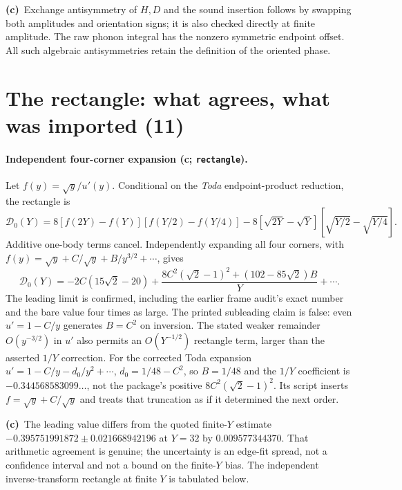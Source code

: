 \documentclass[11pt,a4paper]{article}
\newcommand{\Lc}{\textbf{(c)}\ }
\begin{document}
\Lc Exchange antisymmetry of $H,D$ and the sound insertion follows by swapping
both amplitudes and orientation signs; it is also checked directly at finite
amplitude. The raw phonon integral has the nonzero symmetric endpoint offset.
All such algebraic antisymmetries retain the definition of the oriented phase.

\section{The rectangle: what agrees, what was imported (11)}
\paragraph{Independent four-corner expansion (c; \texttt{rectangle}).}
Let $f(y)=\sqrt y/u'(y)$. Conditional on the \emph{Toda} endpoint-product
reduction, the rectangle is
\begin{equation}
 \mathcal D_0(Y)=8[f(2Y)-f(Y)][f(Y/2)-f(Y/4)]
 -8[\sqrt{2Y}-\sqrt Y][\sqrt{Y/2}-\sqrt{Y/4}].
 \label{eq:rect}
\end{equation}
Additive one-body terms cancel. Independently expanding all four corners,
with $f(y)=\sqrt y+C/\sqrt y+B/y^{3/2}+\cdots$, gives
\begin{equation}
 \mathcal D_0(Y)=-2C(15\sqrt2-20)
 +\frac{8C^2(\sqrt2-1)^2+(102-85\sqrt2)B}{Y}+\cdots.
 \label{eq:rectcorrect}
\end{equation}
The leading limit is confirmed, including the earlier frame audit's exact
number and the bare value four times as large. The printed subleading claim
is false: even $u'=1-C/y$ generates $B=C^2$ on inversion. The stated weaker
remainder $O(y^{-3/2})$ in $u'$ also permits an $O(Y^{-1/2})$ rectangle term,
larger than the asserted $1/Y$ correction. For the corrected Toda expansion
$u'=1-C/y-d_0/y^2+\cdots$, $d_0=1/48-C^2$, so $B=1/48$ and the $1/Y$
coefficient is $-0.344568583099\ldots$, not the package's positive
$8C^2(\sqrt2-1)^2$. Its script inserts $f=\sqrt y+C/\sqrt y$ and treats
that truncation as if it determined the next order.

\Lc The leading value differs from the quoted finite-$Y$ estimate
$-0.395751991872\pm0.021668942196$ at $Y=32$ by $0.009577344370$.
That arithmetic agreement is genuine; the uncertainty is an edge-fit spread,
not a confidence interval and not a bound on the finite-$Y$ bias.
The independent inverse-transform rectangle at finite $Y$ is tabulated below.
\end{document}
